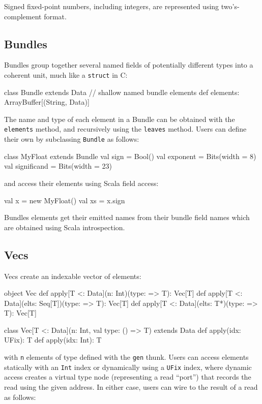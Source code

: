 \documentclass[10pt,twocolumn]{article}
\def\code#1{{\small\tt #1}}
\begin{document}
\noindent
Signed fixed-point
numbers, including integers, are represented using two's-complement
format.  

\subsection{Bundles}

Bundles group together several named fields of potentially different
types into a coherent unit, much like a \code{struct} in C:

\begin{scala}
class Bundle extends Data {
  // shallow named bundle elements
  def elements: ArrayBuffer[(String, Data)]
}
\end{scala}

\noindent
The name and type of each element in a Bundle can be obtained with the
\code{elements} method, and recursively using the \code{leaves}
method.  Users can define their own by subclassing \code{Bundle} as
follows:

\begin{scala}
class MyFloat extends Bundle {
  val sign        = Bool()
  val exponent    = Bits(width = 8)
  val significand = Bits(width = 23)
}
\end{scala}

\noindent
and access their elements using Scala field access:

\begin{scala}
val x  = new MyFloat()
val xs = x.sign
\end{scala}

Bundles elements get their emitted names from their bundle field names
which are obtained using Scala introspection.

\subsection{Vecs}

Vecs create an indexable vector of elements: 

\begin{scala}
object Vec {
  def apply[T <: Data](n: Int)(type: => T): Vec[T]
  def apply[T <: Data](elts: Seq[T])(type: => T): Vec[T]
  def apply[T <: Data](elts: T*)(type: => T): Vec[T]
}

class Vec[T <: Data](n: Int, val type: () => T) 
    extends Data {
  def apply(idx: UFix): T
  def apply(idx: Int): T
}
\end{scala}

\noindent
with \code{n} elements of type defined with the \code{gen} thunk.
Users can access elements statically with an \code{Int} index or
dynamically using a \code{UFix} index, 
where dynamic access creates a virtual type node (representing a read
``port'') that records the read using the given address.  In either case,
users can wire to the result of a read as follows:
\end{document}
